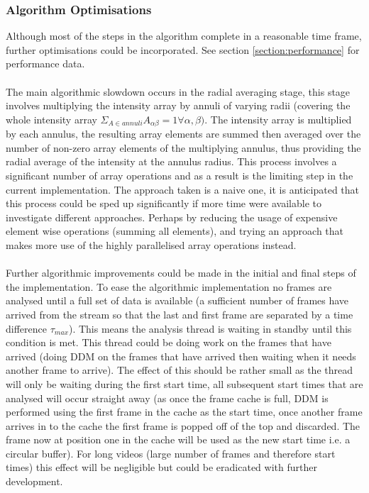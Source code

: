\documentclass[11pt]{article}
\begin{document}
\subsubsection{Algorithm Optimisations}
Although most of the steps in the algorithm complete in a reasonable time frame, further optimisations could be incorporated. See section \ref{section:performance} for performance data. 
\\\\
The main algorithmic slowdown occurs in the radial averaging stage, this stage involves multiplying the intensity array by annuli of varying radii (covering the whole intensity array $\Sigma_{A \in annuli} A_{\alpha \beta} = 1 \forall \alpha, \beta )$. The intensity array is multiplied by each annulus, the resulting array elements are summed then averaged over the number of non-zero array elements of the multiplying annulus, thus providing the radial average of the intensity at the annulus radius. This process involves a significant number of array operations and as a result is the limiting step in the current implementation. The approach taken is a naive one, it is anticipated that this process could be sped up significantly if more time were available to investigate different approaches. Perhaps by reducing the usage of expensive element wise operations (summing all elements), and trying an approach that makes more use of the highly parallelised array operations instead.
\\\\
Further algorithmic improvements could be made in the initial and final steps of the implementation. To ease the algorithmic implementation no frames are analysed until a full set of data is available (a sufficient number of frames have arrived from the stream so that the last and first frame are separated by a time difference $\tau_{max}$). This means the analysis thread is waiting in standby until this condition is met. This thread could be doing work on the frames that have arrived (doing DDM on the frames that have arrived then waiting when it needs another frame to arrive). The effect of this should be rather small as the thread will only be waiting during the first start time, all subsequent start times that are analysed will occur straight away (as once the frame cache is full, DDM is performed using the first frame in the cache as the start time, once another frame arrives in to the cache the first frame is popped off of the top and discarded. The frame now at position one in the cache will be used as the new start time i.e. a circular buffer). For long videos (large number of frames and therefore start times) this effect will be negligible but could be eradicated with further development. 
\end{document}
